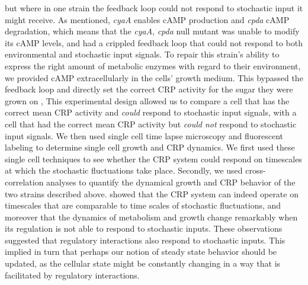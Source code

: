 %
but where in one strain the feedback loop could not respond to stochastic input it might receive.
%
As mentioned, \textit{cyaA} enables cAMP production and \textit{cpda} cAMP degradation, 
%
which means that the \textit{cyaA}, \textit{cpda} null mutant was unable to modify its cAMP levels, and had a crippled feedback loop that could not respond to both environmental and stochastic input signals.
%
%
%
To repair this strain's ability to express the right amount of metabolic enzymes with regard to their environment, 
we provided cAMP extracellularly in the cells' growth medium.
%
This bypassed the feedback loop and directly set the correct CRP activity for the sugar they were grown on \cite{Towbin2017},
%
This experimental design allowed us to compare a cell that has the correct mean CRP activity and \textit{could} respond to stochastic input signals, 
with a cell that had the correct mean CRP activity but \textit{could not} respond to stochastic input signals.
%
We then used single cell time lapse microscopy and fluorescent labeling to determine single cell growth and CRP dynamics. 
%
We first used these single cell techniques to see whether the CRP system could respond on timescales at which the stochastic fluctuations take place.
%
Secondly, we used cross-correlation analyses to quantify the dynamical growth and CRP behavior of the two strains described above.
%
 showed that the CRP system can indeed operate on timescales that are comparable to time scales of stochastic fluctuations, and moreover that
the dynamics of metabolism and growth change remarkably when its regulation is not able to respond to stochastic inputs.
%
These observations suggested that regulatory interactions also respond to stochastic inputs.
%
This implied in turn that perhaps our notion of steady state behavior should be updated, 
as the cellular state might be constantly changing in a way that is facilitated by regulatory interactions.


